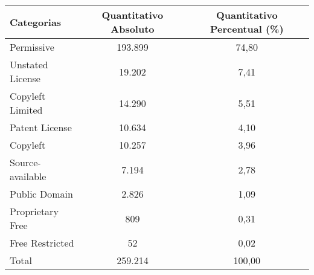     \begin{tabular}{l c c}
        \hline Categorias & Quantitativo Absoluto & Quantitativo Percentual (\%)\\
        \hline        
Permissive                & 193.899                & 74,80                          \\
Unstated License          & 19.202                 & 7,41                          \\
Copyleft Limited          & 14.290                 & 5,51                         \\
Patent License            & 10.634                 & 4,10                       \\
Copyleft                  & 10.257                 & 3,96                     \\
Source-available          & 7.194                  & 2,78                  \\
Public Domain             & 2.826                  & 1,09                  \\
Proprietary Free          & 809                    & 0,31                       \\
Free Restricted           & 52                     & 0,02                        \\
        \hline
Total                     & 259.214                & 100,00                      \\
        \hline
    \end{tabular}